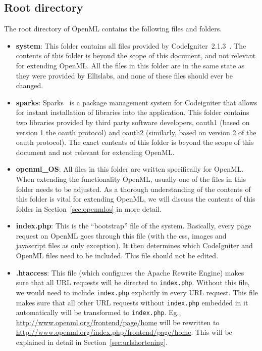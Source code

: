 \documentclass[10pt]{article}
\begin{document}
\subsection{Root directory}
The root directory of OpenML contains the following files and folders. 
\begin{itemize}
\item \textbf{system}: This folder contains all files provided by CodeIgniter~2.1.3~\cite{bib:codeigniter}. The contents of this folder is beyond the scope of this document, and not relevant for extending OpenML. All the files in this folder are in the same state as they were provided by Ellislabs, and none of these files should ever be changed. 
\item \textbf{sparks}: Sparks~\cite{bib:sparks} is a package management system for Codeigniter that allows for instant installation of libraries into the application. This folder contains two libraries provided by third party software developers, oauth1 (based on version 1 the oauth protocol) and oauth2 (similarly, based on version 2 of the oauth protocol). The exact contents of this folder is beyond the scope of this document and not relevant for extending OpenML.
\item \textbf{openml\_OS}: All files in this folder are written specifically for OpenML. When extending the functionality OpenML, usually one of the files in this folder needs to be adjusted. As a thorough understanding of the contents of this folder is vital for extending OpenML, we will discuss the contents of this folder in Section~\ref{sec:openmlos} in more detail.
\item \textbf{index.php}: This is the ``bootstrap'' file of the system. Basically, every page request on OpenML goes through this file (with the css, images and javascript files as only exception). It then determines which CodeIgniter and OpenML files need to be included. This file should not be edited. 
\item \textbf{.htaccess}: This file (which configures the Apache Rewrite Engine) makes sure that all URL requests will be directed to \texttt{index.php}. Without this file, we would need to include \texttt{index.php} explicitly in every URL request. This file makes sure that all other URL requests without \texttt{index.php} embedded in it automatically will be transformed to \texttt{index.php}. Eg., \url{http://www.openml.org/frontend/page/home} will be rewritten to \url{http://www.openml.org/index.php/frontend/page/home}. This will be explained in detail in Section~\ref{sec:urlshortening}.

\end{itemize}
\end{document}
